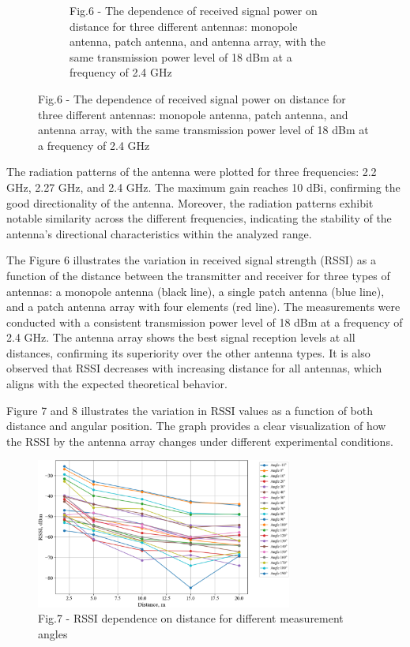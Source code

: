 \begin{figure}[H]
\begin{subfigure}{0.5\textwidth}
       \caption*{Fig.6 - The dependence of received signal power on distance for
   three different antennas: monopole antenna, patch antenna, and antenna
   array, with the same transmission power level of 18 dBm at a frequency
   of 2.4 GHz}
   \end{subfigure}
\end{figure}

\begin{multicols}{2}
The radiation patterns of the antenna were plotted for three
frequencies: 2.2 GHz, 2.27 GHz, and 2.4 GHz. The maximum gain reaches 10
dBi, confirming the good directionality of the antenna. Moreover, the
radiation patterns exhibit notable similarity across the different
frequencies, indicating the stability of the antenna's directional
characteristics within the analyzed range.

The Figure 6 illustrates the variation in received signal strength
(RSSI) as a function of the distance between the transmitter and
receiver for three types of antennas: a monopole antenna (black line), a
single patch antenna (blue line), and a patch antenna array with four
elements (red line). The measurements were conducted with a consistent
transmission power level of 18 dBm at a frequency of 2.4 GHz. The
antenna array shows the best signal reception levels at all distances,
confirming its superiority over the other antenna types. It is also
observed that RSSI decreases with increasing distance for all antennas,
which aligns with the expected theoretical behavior.

Figure 7 and 8 illustrates the variation in RSSI values as a function of
both distance and angular position. The graph provides a clear
visualization of how the RSSI by the antenna array changes under
different experimental conditions.
\end{multicols}

\begin{figure}[H]
	\centering
	\includegraphics[width=0.75\textwidth]{media/ict/image47}
	\caption*{Fig.7 - RSSI dependence on distance for different measurement angles}
\end{figure}


